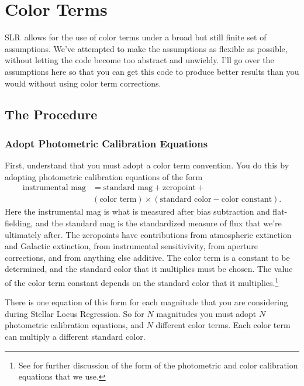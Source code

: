 \documentclass{report}
\newcommand{\slr}{SLR}
\begin{document}
\chapter{Color Terms}
\label{sec:colorterms}

\slr\ allows for the use of color terms under a broad but still finite
set of assumptions.  We've attempted to make the assumptions as
flexible as possible, without letting the code become too abstract and
unwieldy.  I'll go over the assumptions here so that you can get this
code to produce better results than you would without using color term
corrections.


\section{The Procedure}
\subsection{Adopt Photometric Calibration Equations}

First, understand that you must adopt a color term convention.  You do
this by adopting photometric calibration equations of the form
\begin{subequations} 
\begin{align}
  \textrm{instrumental mag} & = \textrm{standard mag} + \textrm{zeropoint} + \\
  & (\textrm{color term})\times(\textrm{standard color} -
  \textrm{color constant}).
\end{align}
\end{subequations}
Here the instrumental mag is what is measured after bias subtraction
and flat-fielding, and the standard mag is the standardized measure of
flux that we're ultimately after.  The zeropoints have contributions
from atmospheric extinction and Galactic extinction, from instrumental
sensitivivity, from aperture corrections, and from anything else
additive.  The color term is a constant to be determined, and the
standard color that it multiplies must be chosen.  The value of the
color term constant depends on the standard color that it
multiplies.\footnote{See \citet{bib:slr} for further discussion of the
  form of the photometric and color calibration equations that we use.
}

There is one equation of this form for each magnitude that you are
considering during Stellar Locus Regression.  So for $N$ magnitudes
you must adopt $N$ photometric calibration equations, and $N$
different color terms.  Each color term can multiply a different
standard color.
\end{document}

